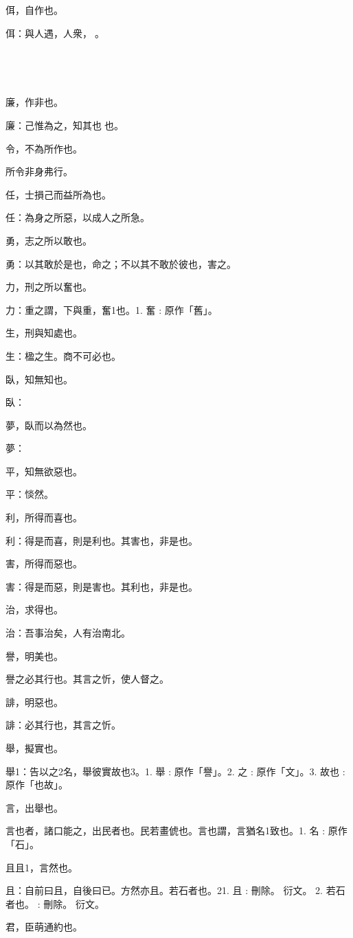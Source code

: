 \begin{pinyinscope}
佴，自作也。

佴：與人遇，人衆，𢝺。

𧨜，作嗛也。

𧨜：為是為是之台彼也，弗為也。

廉，作非也。

廉：己惟為之，知其也𦖷也。

令，不為所作也。

所令非身弗行。

任，士損己而益所為也。

任：為身之所惡，以成人之所急。

勇，志之所以敢也。

勇：以其敢於是也，命之；不以其不敢於彼也，害之。

力，刑之所以奮也。

力：重之謂，下與重，奮1也。1. 奮 : 原作「舊」。

生，刑與知處也。

生：楹之生。商不可必也。

臥，知無知也。

臥：

夢，臥而以為然也。

夢：

平，知無欲惡也。

平：惔然。

利，所得而喜也。

利：得是而喜，則是利也。其害也，非是也。

害，所得而惡也。

害：得是而惡，則是害也。其利也，非是也。

治，求得也。

治：吾事治矣，人有治南北。

譽，明美也。

譽之必其行也。其言之忻，使人督之。

誹，明惡也。

誹：必其行也，其言之忻。

舉，擬實也。

舉1：告以之2名，舉彼實故也3。1. 舉 : 原作「譽」。2. 之 : 原作「文」。3. 故也 : 原作「也故」。

言，出舉也。

言也者，諸口能之，出民者也。民若畫俿也。言也謂，言猶名1致也。1. 名 : 原作「石」。

且且1，言然也。

且：自前曰且，自後曰已。方然亦且。若石者也。21. 且 : 刪除。 衍文。 2. 若石者也。 : 刪除。 衍文。

君，臣萌通約也。


\end{pinyinscope}
